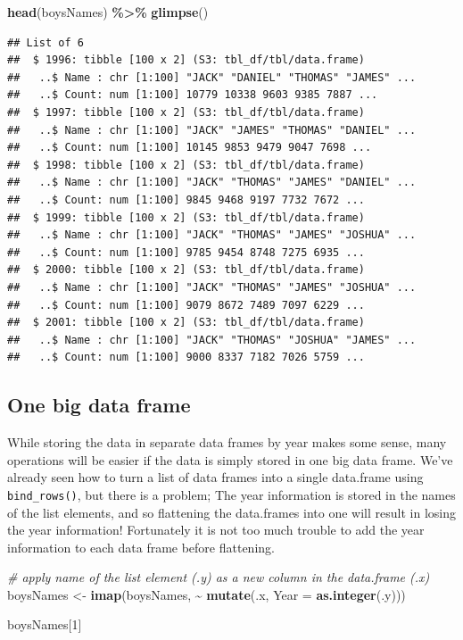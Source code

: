 \documentclass[
]{book}
\newenvironment{Shaded}{\begin{snugshade}}{\end{snugshade}}
\newcommand{\CommentTok}[1]{\textcolor[rgb]{0.56,0.35,0.01}{\textit{#1}}}
\newcommand{\DataTypeTok}[1]{\textcolor[rgb]{0.13,0.29,0.53}{#1}}
\newcommand{\DecValTok}[1]{\textcolor[rgb]{0.00,0.00,0.81}{#1}}
\newcommand{\KeywordTok}[1]{\textcolor[rgb]{0.13,0.29,0.53}{\textbf{#1}}}
\newcommand{\NormalTok}[1]{#1}
\newcommand{\OperatorTok}[1]{\textcolor[rgb]{0.81,0.36,0.00}{\textbf{#1}}}
\newcommand{\StringTok}[1]{\textcolor[rgb]{0.31,0.60,0.02}{#1}}
\begin{document}
\begin{Shaded}
\begin{Highlighting}[]
\KeywordTok{head}\NormalTok{(boysNames) }\OperatorTok{\%\textgreater{}\%}\StringTok{ }\KeywordTok{glimpse}\NormalTok{() }
\end{Highlighting}
\end{Shaded}

\begin{verbatim}
## List of 6
##  $ 1996: tibble [100 x 2] (S3: tbl_df/tbl/data.frame)
##   ..$ Name : chr [1:100] "JACK" "DANIEL" "THOMAS" "JAMES" ...
##   ..$ Count: num [1:100] 10779 10338 9603 9385 7887 ...
##  $ 1997: tibble [100 x 2] (S3: tbl_df/tbl/data.frame)
##   ..$ Name : chr [1:100] "JACK" "JAMES" "THOMAS" "DANIEL" ...
##   ..$ Count: num [1:100] 10145 9853 9479 9047 7698 ...
##  $ 1998: tibble [100 x 2] (S3: tbl_df/tbl/data.frame)
##   ..$ Name : chr [1:100] "JACK" "THOMAS" "JAMES" "DANIEL" ...
##   ..$ Count: num [1:100] 9845 9468 9197 7732 7672 ...
##  $ 1999: tibble [100 x 2] (S3: tbl_df/tbl/data.frame)
##   ..$ Name : chr [1:100] "JACK" "THOMAS" "JAMES" "JOSHUA" ...
##   ..$ Count: num [1:100] 9785 9454 8748 7275 6935 ...
##  $ 2000: tibble [100 x 2] (S3: tbl_df/tbl/data.frame)
##   ..$ Name : chr [1:100] "JACK" "THOMAS" "JAMES" "JOSHUA" ...
##   ..$ Count: num [1:100] 9079 8672 7489 7097 6229 ...
##  $ 2001: tibble [100 x 2] (S3: tbl_df/tbl/data.frame)
##   ..$ Name : chr [1:100] "JACK" "THOMAS" "JOSHUA" "JAMES" ...
##   ..$ Count: num [1:100] 9000 8337 7182 7026 5759 ...
\end{verbatim}

\hypertarget{one-big-data-frame}{%
\subsection{One big data frame}\label{one-big-data-frame}}

While storing the data in separate data frames by year makes some sense,
many operations will be easier if the data is simply stored in one big
data frame. We've already seen how to turn a list of data frames into a
single data.frame using \texttt{bind\_rows()}, but there is a problem; The year
information is stored in the names of the list elements, and so
flattening the data.frames into one will result in losing the year
information! Fortunately it is not too much trouble to add the year
information to each data frame before flattening.

\begin{Shaded}
\begin{Highlighting}[]
\CommentTok{\# apply name of the list element (.y) as a new column in the data.frame (.x)}
\NormalTok{boysNames \textless{}{-}}\StringTok{ }\KeywordTok{imap}\NormalTok{(boysNames, }\OperatorTok{\textasciitilde{}}\StringTok{ }\KeywordTok{mutate}\NormalTok{(.x, }\DataTypeTok{Year =} \KeywordTok{as.integer}\NormalTok{(.y)))}

\NormalTok{boysNames[}\DecValTok{1}\NormalTok{]}
\end{Highlighting}
\end{Shaded}
\end{document}

